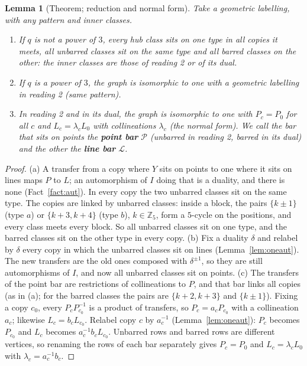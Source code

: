 \documentclass[11pt]{amsart}
\theoremstyle{plain}
\newtheorem{lemma}{Lemma}[section]
\theoremstyle{definition}
\theoremstyle{remark}
\newcommand{\cP}{\mathcal{P}}
\newcommand{\cL}{\mathcal{L}}
\newcommand{\pP}{P}  %
\newcommand{\lL}{L}  %
\begin{document}
\begin{lemma}[Theorem; reduction and normal form]\label{lem:reduce}
Take a geometric labelling, with any pattern and inner classes.
\begin{enumerate}[label=(\alph*)]
\item If $q$ is not a power of $3$, every hub class sits on one type in all copies it meets, all unbarred classes sit
  on the same type and all barred classes on the other: the inner classes are those of reading 2 or of its dual.
\item If $q$ is a power of $3$, the graph is isomorphic to one with a geometric labelling in reading 2 (same pattern).
\item In reading 2 and in its dual, the graph is isomorphic to one with $P_c = P_0$ for all $c$ and $L_c = \lambda_cL_0$
  with collineations $\lambda_c$ (the \emph{normal form}). We call the bar that sits on points the \textbf{point bar}
  $\cP$ (unbarred in reading 2, barred in its dual) and the other the \textbf{line bar} $\cL$.
\end{enumerate}
\end{lemma}

\begin{proof}
(a) A transfer from a copy where $Y$ sits on points to one where it sits on lines maps $\pP$ to $\lL$; an automorphism of
$I$ doing that is a duality, and there is none (Fact~\ref{fact:aut}). In every copy the two unbarred classes sit on the
same type. The copies are linked by unbarred classes: inside a block, the pairs $\{k \pm 1\}$ (type $a$) or
$\{k+3, k+4\}$ (type $b$), $k \in \mathbb{Z}_5$, form a $5$-cycle on the positions, and every class meets every block. So
all unbarred classes sit on one type, and the barred classes sit on the other type in every copy.
(b) Fix a duality $\delta$ and relabel by $\delta$ every copy in which the unbarred classes sit on lines
(Lemma~\ref{lem:oneaut}). The new transfers are the old ones composed with $\delta^{\pm1}$, so they are still
automorphisms of $I$, and now all unbarred classes sit on points.
(c) The transfers of the point bar are restrictions of collineations to $\pP$, and that bar links all copies (as in
(a); for the barred classes the pairs are $\{k+2, k+3\}$ and $\{k \pm 1\}$). Fixing a copy $c_0$, every
$P_cP_{c_0}^{-1}$ is a product of transfers, so $P_c = a_cP_{c_0}$ with a collineation $a_c$; likewise
$L_c = b_cL_{c_0}$. Relabel copy $c$ by $a_c^{-1}$ (Lemma~\ref{lem:oneaut}): $P_c$ becomes $P_{c_0}$ and $L_c$ becomes
$a_c^{-1}b_cL_{c_0}$. Unbarred rows and barred rows are different vertices, so renaming the rows of each bar separately
gives $P_c = P_0$ and $L_c = \lambda_cL_0$ with $\lambda_c = a_c^{-1}b_c$.
\end{proof}
\end{document}
